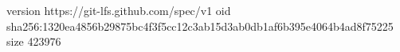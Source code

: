 version https://git-lfs.github.com/spec/v1
oid sha256:1320ea4856b29875bc4f3f5cc12c3ab15d3ab0db1af6b395e4064b4ad8f75225
size 423976
